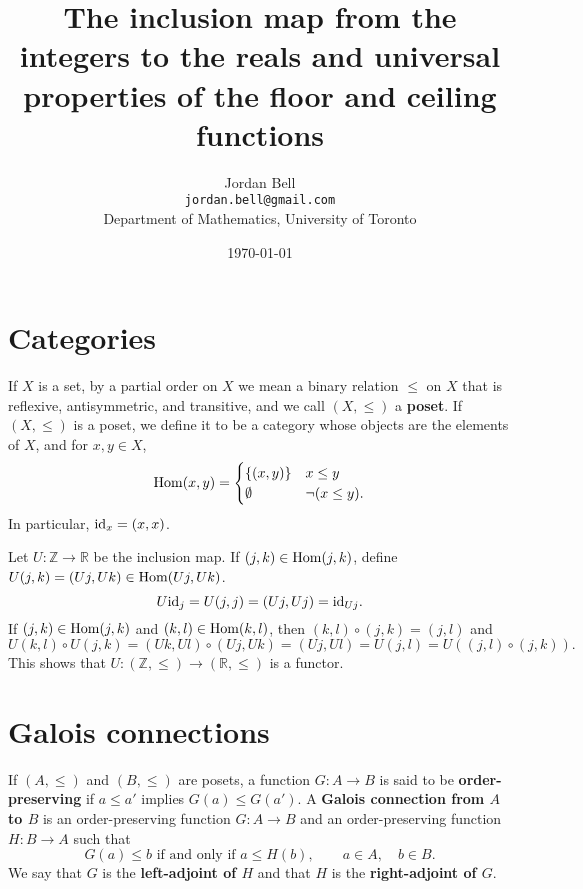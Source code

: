 \documentclass{article}
\newcommand{\id}{\ensuremath\mathrm{id}}
\newcommand{\Hom}{\ensuremath\mathrm{Hom}}
\theoremstyle{definition}
\begin{document}
\title{The inclusion map from the integers to the reals
and universal properties of the floor and ceiling functions}
\author{Jordan Bell\\ \texttt{jordan.bell@gmail.com}\\Department of Mathematics, University of Toronto}
\date{\today}

\maketitle


\section{Categories}
If $X$ is a set, by a partial order on $X$ we mean a binary relation $\leq$ on $X$ that is reflexive, antisymmetric, and transitive, and we call
$(X,\leq)$ a \textbf{poset}. 
If $(X,\leq)$ is a poset, we define it to be a category whose objects are the elements of $X$, and
for $x,y \in X$, 
\[
\Hom(x,y) = \begin{cases}
\{(x,y)\}&x \leq y\\
\emptyset&\neg (x \leq y).
\end{cases}
\]
In particular, $\id_x = (x,x)$. 

Let $U:\mathbb{Z} \to \mathbb{R}$ be the inclusion map. 
If $(j,k) \in \Hom(j,k)$, define
$U(j,k) = (Uj,Uk) \in \Hom(Uj,Uk)$. 
\[
U\id_j = U(j,j) = (Uj,Uj) = \id_{Uj}.
\]
If $(j,k) \in \Hom(j,k)$ and $(k,l) \in \Hom(k,l)$, then 
$(k,l) \circ (j,k) = (j,l)$ and 
\[
U(k,l) \circ U(j,k)  =(Uk,Ul) \circ (Uj,Uk)   =  (Uj,Ul) = U(j,l)
=U((j,l) \circ (j,k)).
\] 
This shows that $U:(\mathbb{Z},\leq) \to (\mathbb{R},\leq)$ is a functor.




\section{Galois connections}
If $(A,\leq)$ and $(B,\leq)$ are posets, 
a function $G:A \to B$ is said to be \textbf{order-preserving} if 
$a \leq a'$ implies $G(a) \leq G(a')$. 
A \textbf{Galois connection from $A$ to $B$}
is an order-preserving function $G:A \to B$ and an order-preserving function $H:B \to A$
such that
\[
\textrm{$G(a) \leq b$ if and only if $a \leq H(b)$},\qquad a \in A,\quad b \in B.
\]
We say that $G$ is the \textbf{left-adjoint of $H$} and that
$H$ is the \textbf{right-adjoint of $G$}.
\end{document}
